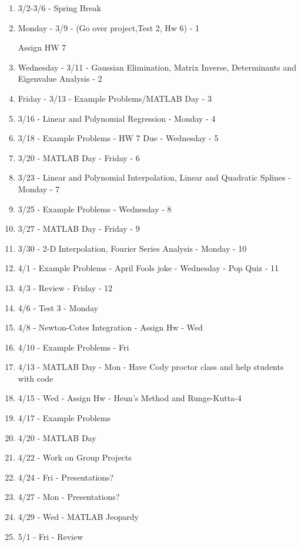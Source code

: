 \begin{enumerate}
\item 3/2-3/6 - Spring Break 

\item Monday - 3/9 - (Go over project,Test 2, Hw 6) - 1

  Assign HW 7

\item Wednesday - 3/11 - Gaussian Elimination, Matrix Inverse, Determinants and
  Eigenvalue Analysis - 2

\item Friday - 3/13 - Example Problems/MATLAB Day - 3

\item 3/16 - Linear and Polynomial Regression - Monday - 4

\item 3/18 - Example Problems - HW 7 Due - Wednesday - 5
 
\item 3/20 - MATLAB Day - Friday - 6

\item 3/23 - Linear and Polynomial Interpolation, Linear and Quadratic Splines -
  Monday - 7

\item 3/25 - Example Problems - Wednesday - 8

\item 3/27 - MATLAB Day - Friday - 9

\item 3/30 - 2-D Interpolation, Fourier Series Analysis - Monday - 10

\item 4/1 - Example Problems - April Fools joke - Wednesday - Pop Quiz
  - 11

\item 4/3 - Review - Friday - 12

\item 4/6 - Test 3 - Monday

\item 4/8 - Newton-Cotes Integration - Assign Hw - Wed

\item 4/10 - Example Problems - Fri

\item 4/13 - MATLAB Day - Mon - Have Cody proctor class and help
  students with code

\item 4/15 - Wed - Assign Hw - Heun's Method and Runge-Kutta-4

\item 4/17 - Example Problems

\item 4/20 - MATLAB Day 

\item 4/22 - Work on Group Projects

\item 4/24 - Fri - Presentations?

\item 4/27 - Mon - Presentations? 

\item 4/29 - Wed - MATLAB Jeopardy

\item 5/1 - Fri - Review

\end{enumerate}

